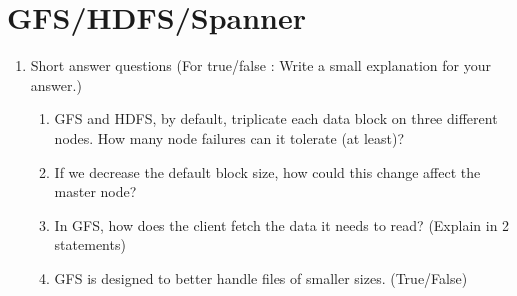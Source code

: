 \documentclass{article}
\begin{document}
\section{GFS/HDFS/Spanner}
\begin{enumerate}
\item Short answer questions (For true/false : Write a small explanation for your answer.)

\begin{enumerate}
\item GFS and HDFS, by default, triplicate each data block on three different nodes. How many node failures can it tolerate (at least)?
\item If we decrease the default block size, how could this change affect the master node?
\item In GFS, how does the client fetch the data it needs to read? (Explain in 2 statements)
\item GFS is designed to better handle files of smaller sizes. (True/False)
\end{enumerate}
\end{enumerate}

\clearpage
\end{document}
